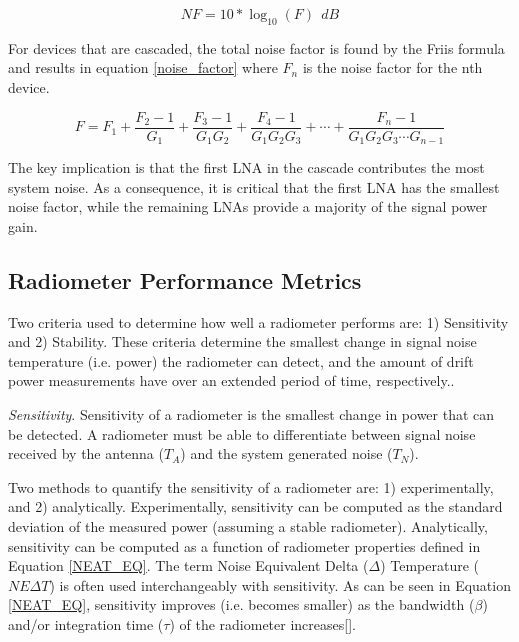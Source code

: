 \begin{equation}\label{noise_figure}
NF=10 * \log_{10}(F)\ \ dB
\end{equation}

For devices that are cascaded, the total noise factor is found by the Friis formula and results in equation \ref{noise_factor} where $F_n$ is the noise factor for the nth device.  

\begin{equation}\label{noise_factor}
F=F_1+\frac{F_2-1}{G_1}+\frac{F_3-1}{G_1 G_2}+\frac{F_4-1}{G_1 G_2 G_3}+\cdots +\frac{F_n-1}{G_1 G_2 G_3 \cdots G_{n-1}}
\end{equation}

The key implication is that the first LNA in the cascade contributes the most system noise.  As a consequence, it is critical that the first LNA has the smallest noise factor, while the remaining LNAs provide a majority of the signal power gain.

\subsection{Radiometer Performance Metrics}\label{performance_metrics}

Two criteria used to determine how well a radiometer performs are: 1) Sensitivity and 2) Stability.  These criteria determine the smallest change in signal noise temperature (i.e. power) the radiometer can detect, and the amount of drift power measurements have over an extended period of time, respectively..

\emph{Sensitivity}.  Sensitivity of a radiometer is the smallest change in power that can be detected.  A radiometer must be able to differentiate between signal noise received by  the antenna ($T_{A}$) and the system generated noise ($T_N$).

Two methods to quantify the sensitivity of a radiometer are: 1) experimentally, and 2) analytically.  Experimentally, sensitivity can be computed as the standard deviation of the measured power (assuming a stable radiometer).  Analytically, sensitivity can be computed as a function of radiometer properties defined in Equation \ref{NEAT_EQ}.  The term Noise Equivalent Delta ($\Delta$) Temperature ($NE\Delta T$) is often used interchangeably with sensitivity.  As can be seen in Equation \ref{NEAT_EQ}, sensitivity improves (i.e. becomes smaller) as the bandwidth ($\beta$) and/or integration time ($\tau$) of the radiometer increases[\cite{ulaby}].

